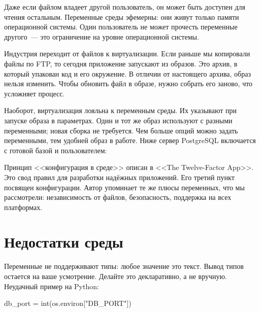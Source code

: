 Даже если файлом владеет другой пользователь, он может быть доступен для чтения
остальным. Переменные среды эфемерны: они живут только памяти операционной
системы. Один пользователь не может прочесть переменные другого~--- это
ограничение на уровне операционной системы.


Индустрия переходит от файлов к виртуализации. Если раньше мы копировали файлы
по FTP, то сегодня приложение запускают из образов. Это архив, в который
упакован код и его окружение. В отличии от настоящего архива, образ нельзя
изменить. Чтобы обновить файл в образе, нужно собрать его заново, что усложняет
процесс.


Наоборот, виртуализация лояльна к переменным среды. Их указывают при запуске
образа в параметрах. Один и тот же образ используют с разными переменными; новая
сборка не требуется. Чем больше опций можно задать переменными, тем удобней
образ в работе. Ниже сервер PostgreSQL включается с готовой базой и
пользователем:

\begin{english}
\end{english}


Принцип <<конфигурация в среде>> описан в <<The Twelve-Factor App>>.
Это свод правил для разработки надёжных приложений. Его третий пункт посвящен конфигурации.
Автор упоминает те же плюсы переменных, что мы рассмотрели: независимость от файлов,
безопасность, поддержка на всех платформах.

\section{Недостатки среды}

\index{декларативность}

Переменные не поддерживают типы: любое значение это текст. Вывод типов остается
на ваше усмотрение. Делайте это декларативно, а не вручную. Неудачный пример на
Python:

\index{языки!Python}

\begin{english}
  \begin{python}
db_port = int(os.environ["DB_PORT"])
  \end{python}
\end{english}

